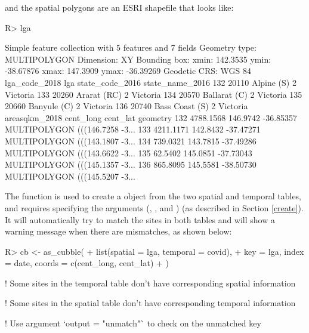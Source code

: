 \documentclass[
]{jss}
\begin{document}
and the spatial polygons are an ESRI shapefile that looks like:

\begin{CodeChunk}
\begin{CodeInput}
R> lga %
\end{CodeInput}
\begin{CodeOutput}
Simple feature collection with 5 features and 7 fields
Geometry type: MULTIPOLYGON
Dimension:     XY
Bounding box:  xmin: 142.3535 ymin: -38.67876 xmax: 147.3909 ymax: -36.39269
Geodetic CRS:  WGS 84
    lga_code_2018            lga state_code_2016 state_name_2016
132         20110     Alpine (S)               2        Victoria
133         20260    Ararat (RC)               2        Victoria
134         20570   Ballarat (C)               2        Victoria
135         20660    Banyule (C)               2        Victoria
136         20740 Bass Coast (S)               2        Victoria
    areasqkm_2018 cent_long  cent_lat                       geometry
132     4788.1568  146.9742 -36.85357 MULTIPOLYGON (((146.7258 -3...
133     4211.1171  142.8432 -37.47271 MULTIPOLYGON (((143.1807 -3...
134      739.0321  143.7815 -37.49286 MULTIPOLYGON (((143.6622 -3...
135       62.5402  145.0851 -37.73043 MULTIPOLYGON (((145.1357 -3...
136      865.8095  145.5581 -38.50730 MULTIPOLYGON (((145.5207 -3...
\end{CodeOutput}
\end{CodeChunk}

The function  is used to create a  object from the two spatial and temporal tables, and requires specifying the arguments (, , and ) (as described in Section \ref{create}). It will automatically try to match the sites in both tables and will show a warning message when there are mismatches, as shown below:

\begin{CodeChunk}
\begin{CodeInput}
R> cb <- as_cubble(
+   list(spatial = lga, temporal = covid),
+   key = lga, index = date, coords = c(cent_long, cent_lat)
+   )
\end{CodeInput}
\begin{CodeOutput}
! Some sites in the temporal table don't have corresponding spatial information
\end{CodeOutput}
\begin{CodeOutput}
! Some sites in the spatial table don't have corresponding temporal information
\end{CodeOutput}
\begin{CodeOutput}
! Use argument `output = "unmatch"` to check on the unmatched key
\end{CodeOutput}
\end{CodeChunk}
\end{document}
